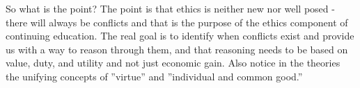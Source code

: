 So what is the point?  The point is that ethics is neither new nor well posed - there will always be conflicts and that is the purpose of the ethics component of continuing education.  The real goal is to identify when conflicts exist and provide us with a way to reason through them, and that reasoning needs to be based on value, duty, and utility and not just economic gain.  Also notice in the theories the unifying concepts of ''virtue'' and ''individual and common good.''